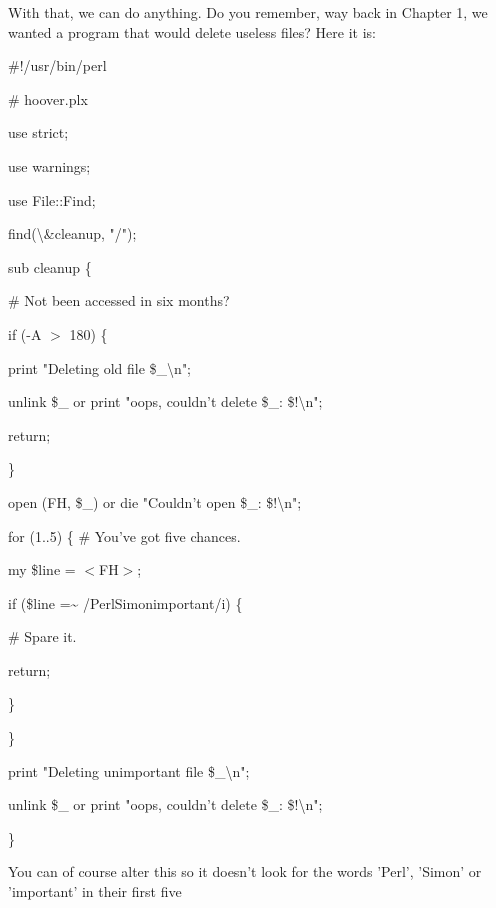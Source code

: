 \documentclass[a4paper,11pt]{book}
\begin{document}
\noindent 

\noindent 

\noindent With that, we can do anything. Do you remember, way back in Chapter 1, we wanted a program that would delete useless files? Here it is:

\noindent 

\noindent 

\noindent \#!/usr/bin/perl

\noindent \# hoover.plx

\noindent use strict;

\noindent use warnings;

\noindent 

\noindent use File::Find;

\noindent find(\textbackslash \&cleanup, "/");

\noindent 

\noindent sub cleanup \{

\noindent \# Not been accessed in six months?

\noindent if (-A $>$ 180) \{

\noindent print "Deleting old file \$\_\textbackslash n";

\noindent unlink \$\_  or print "oops, couldn't delete \$\_: \$!\textbackslash n";

\noindent return;

\noindent \}

\noindent open (FH, \$\_) or die "Couldn't open \$\_: \$!\textbackslash n";

\noindent for (1..5) \{ \# You've got five chances.

\noindent my \$line = $<$FH$>$;

\noindent if (\$line =\~{} /Perl\textbar Simon\textbar important/i) \{

\noindent \# Spare it.

\noindent return;

\noindent \}

\noindent \}

\noindent print "Deleting unimportant file \$\_\textbackslash n";

\noindent unlink \$\_  or print "oops, couldn't delete \$\_: \$!\textbackslash n";

\noindent \}

\noindent 

\noindent You can of course alter this so it doesn't look for the words 'Perl', 'Simon' or 'important' in their first five
\end{document}

